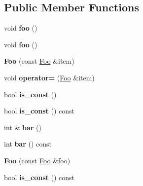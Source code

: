 \subsection*{Public Member Functions}
\begin{DoxyCompactItemize}
\item 
\hypertarget{structFoo_acd41ad3b3d406b0f53022911058ed488}{}void {\bfseries foo} ()\label{structFoo_acd41ad3b3d406b0f53022911058ed488}

\item 
\hypertarget{structFoo_acd41ad3b3d406b0f53022911058ed488}{}void {\bfseries foo} ()\label{structFoo_acd41ad3b3d406b0f53022911058ed488}

\item 
\hypertarget{structFoo_ad3fe1b6da38a19837b3680e0972f7522}{}{\bfseries Foo} (const \hyperlink{structFoo}{Foo} \&item)\label{structFoo_ad3fe1b6da38a19837b3680e0972f7522}

\item 
\hypertarget{structFoo_a507bada3083d138fcf6e30477eae1559}{}void {\bfseries operator=} (\hyperlink{structFoo}{Foo} \&item)\label{structFoo_a507bada3083d138fcf6e30477eae1559}

\item 
\hypertarget{structFoo_a2c236bbbc4f98ff079f595200e1cf393}{}bool {\bfseries is\+\_\+const} ()\label{structFoo_a2c236bbbc4f98ff079f595200e1cf393}

\item 
\hypertarget{structFoo_a6188c776a5d2f1f37a72485f948c2491}{}bool {\bfseries is\+\_\+const} () const \label{structFoo_a6188c776a5d2f1f37a72485f948c2491}

\item 
\hypertarget{structFoo_af3507227c5b792323635950167efc5e6}{}int \& {\bfseries bar} ()\label{structFoo_af3507227c5b792323635950167efc5e6}

\item 
\hypertarget{structFoo_a51989753a99c92493d97376719562bd5}{}int {\bfseries bar} () const \label{structFoo_a51989753a99c92493d97376719562bd5}

\item 
\hypertarget{structFoo_aa1c71f4519773fb8357337dfb1a7f73a}{}{\bfseries Foo} (const \hyperlink{structFoo}{Foo} \&foo)\label{structFoo_aa1c71f4519773fb8357337dfb1a7f73a}

\item 
\hypertarget{structFoo_a6188c776a5d2f1f37a72485f948c2491}{}bool {\bfseries is\+\_\+const} () const \label{structFoo_a6188c776a5d2f1f37a72485f948c2491}


\end{DoxyCompactItemize}
